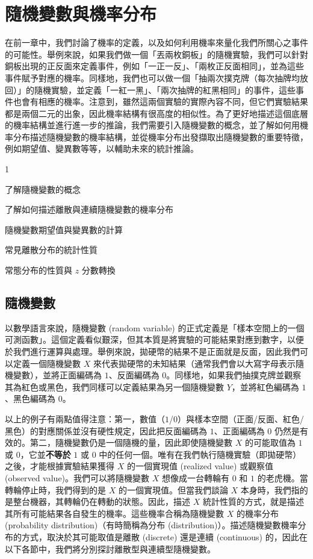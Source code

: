 \chapter{隨機變數與機率分布}
    在前一章中，我們討論了機率的定義，以及如何利用機率來量化我們所關心之事件的可能性。舉例來說，如果我們做一個「丟兩枚銅板」的隨機實驗，我們可以針對銅板出現的正反面來定義事件，例如「一正一反」、「兩枚正反面相同」，並為這些事件賦予對應的機率。同樣地，我們也可以做一個「抽兩次撲克牌（每次抽牌均放回）」的隨機實驗，並定義「一紅一黑」、「兩次抽牌的紅黑相同」的事件，這些事件也會有相應的機率。注意到，雖然這兩個實驗的實際內容不同，但它們實驗結果都是兩個二元的出象，因此機率結構有很高度的相似性。為了更好地描述這個底層的機率結構並進行進一步的推論，我們需要引入隨機變數的概念，並了解如何用機率分布描述隨機變數的機率結構，並從機率分布出發擷取出隨機變數的重要特徵，例如期望值、變異數等等，以輔助未來的統計推論。
    
\begin{introduction}{1}
    \item 了解隨機變數的概念
    \item 了解如何描述離散與連續隨機變數的機率分布
    \item 隨機變數期望值與變異數的計算
    \item 常見離散分布的統計性質
    \item 常態分布的性質與 $z$ 分數轉換
\end{introduction}

\section{隨機變數}

    以數學語言來說，隨機變數 (random variable) 的正式定義是「樣本空間上的一個可測函數」。這個定義看似艱深，但其本質是將實驗的可能結果對應到數字，以便於我們進行運算與處理。舉例來說，拋硬幣的結果不是正面就是反面，因此我們可以定義一個隨機變數 $X$ 來代表拋硬幣的未知結果（通常我們會以大寫字母表示隨機變數），並將正面編碼為 $1$、反面編碼為 $0$。同樣地，如果我們抽撲克牌並觀察其為紅色或黑色，我們同樣可以定義結果為另一個隨機變數 $Y$，並將紅色編碼為 $1$、黑色編碼為 $0$。

    \medskip
    
    以上的例子有兩點值得注意：第一，數值（$1$/$0$）與樣本空間（正面/反面、紅色/黑色）的對應關係並沒有硬性規定，因此把反面編碼為 $1$、正面編碼為 $0$ 仍然是有效的。第二，隨機變數仍是一個隨機的量，因此即使隨機變數 $X$ 的可能取值為 $1$ 或 $0$，它並\textbf{不等於} $1$ 或 $0$ 中的任何一個。唯有在我們執行隨機實驗（即拋硬幣）之後，才能根據實驗結果獲得 $X$ 的一個實現值 (realized value) 或觀察值 (observed value)。我們可以將隨機變數 $X$ 想像成一台轉輪有 $0$ 和 $1$ 的老虎機。當轉輪停止時，我們得到的是 $X$ 的一個實現值。但當我們談論 $X$ 本身時，我們指的是整台機器，其轉輪仍在轉動的狀態。因此，描述 $X$ 統計性質的方式，就是描述其所有可能結果各自發生的機率。這些機率合稱為隨機變數 $X$ 的機率分布 (probability distribution)（有時簡稱為分布 (distribution)）。描述隨機變數機率分布的方式，取決於其可能取值是離散 (discrete) 還是連續 (continuous) 的，因此在以下各節中，我們將分別探討離散型與連續型隨機變數。
    

